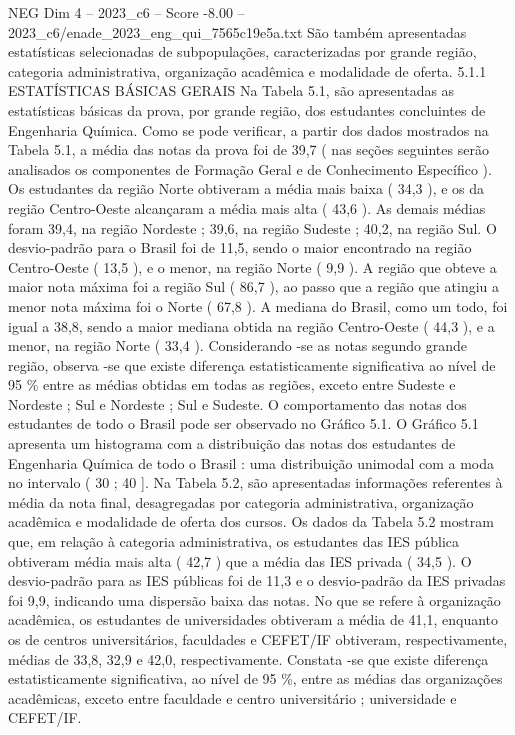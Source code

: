 \begin{textsample}{NEG Dim 4 – 2023\_c6 – Score -8.00 – 2023\_c6/enade\_2023\_eng\_qui\_7565c19e5a.txt}
São também apresentadas estatísticas selecionadas de subpopulações, caracterizadas por grande região, categoria administrativa, organização acadêmica e modalidade de oferta. 5.1.1 ESTATÍSTICAS BÁSICAS GERAIS Na Tabela 5.1, são apresentadas as estatísticas básicas da prova, por grande região, dos estudantes concluintes de Engenharia Química.
Como se pode verificar, a partir dos dados mostrados na Tabela 5.1, a média das notas da prova foi de 39,7 ( nas seções seguintes serão analisados os componentes de Formação Geral e de Conhecimento Específico ).
Os estudantes da região Norte obtiveram a média mais baixa ( 34,3 ), e os da região Centro-Oeste alcançaram a média mais alta ( 43,6 ).
As demais médias foram 39,4, na região Nordeste ; 39,6, na região Sudeste ; 40,2, na região Sul.
O desvio-padrão para o Brasil foi de 11,5, sendo o maior encontrado na região Centro-Oeste ( 13,5 ), e o menor, na região Norte ( 9,9 ).
A região que obteve a maior nota máxima foi a região Sul ( 86,7 ), ao passo que a região que atingiu a menor nota máxima foi o Norte ( 67,8 ).
A mediana do Brasil, como um todo, foi igual a 38,8, sendo a maior mediana obtida na região Centro-Oeste ( 44,3 ), e a menor, na região Norte ( 33,4 ).
Considerando -se as notas segundo grande região, observa -se que existe diferença estatisticamente significativa ao nível de 95 \% entre as médias obtidas em todas as regiões, exceto entre Sudeste e Nordeste ; Sul e Nordeste ; Sul e Sudeste.
O comportamento das notas dos estudantes de todo o Brasil pode ser observado no Gráfico 5.1.
O Gráfico 5.1 apresenta um histograma com a distribuição das notas dos estudantes de Engenharia Química de todo o Brasil : uma distribuição unimodal com a moda no intervalo ( 30 ; 40 ].
Na Tabela 5.2, são apresentadas informações referentes à média da nota final, desagregadas por categoria administrativa, organização acadêmica e modalidade de oferta dos cursos.
Os dados da Tabela 5.2 mostram que, em relação à categoria administrativa, os estudantes das IES pública obtiveram média mais alta ( 42,7 ) que a média das IES privada ( 34,5 ).
O desvio-padrão para as IES públicas foi de 11,3 e o desvio-padrão da IES privadas foi 9,9, indicando uma dispersão baixa das notas.
No que se refere à organização acadêmica, os estudantes de universidades obtiveram a média de 41,1, enquanto os de centros universitários, faculdades e CEFET/IF obtiveram, respectivamente, médias de 33,8, 32,9 e 42,0, respectivamente.
Constata -se que existe diferença estatisticamente significativa, ao nível de 95 \%, entre as médias das organizações acadêmicas, exceto entre faculdade e centro universitário ; universidade e CEFET/IF.

\end{textsample}
